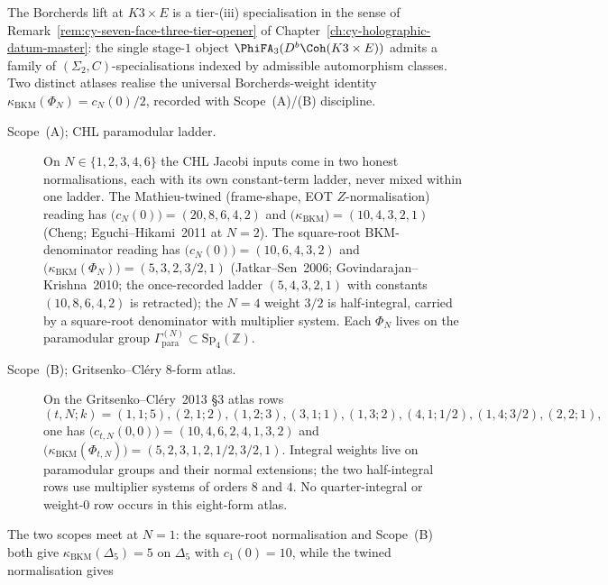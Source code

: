 \begin{remark}
\label{rem:modkos-k3e-cohft-three-tier}
The Borcherds lift at $K3 \times E$ is a tier-(iii)
specialisation in the sense of
Remark~\ref{rem:cy-seven-face-three-tier-opener} of
Chapter~\ref{ch:cy-holographic-datum-master}: the single stage-$1$
object $\PhiFA_3(D^b\Coh(K3 \times E))$ admits a family of
$(\Sigma_2, C)$-specialisations indexed by admissible automorphism
classes. Two distinct atlases realise the universal Borcherds-weight
identity $\kappa_{\mathrm{BKM}}(\Phi_N) = c_N(0)/2$, recorded with
Scope~(A)/(B) discipline.
\begin{description}
 \item[Scope~(A); CHL paramodular ladder.] On
 $N \in \{1, 2, 3, 4, 6\}$ the CHL Jacobi inputs come in two honest
 normalisations, each with its own constant-term ladder, never mixed
 within one ladder. The Mathieu-twined (frame-shape,
 EOT $Z$-normalisation) reading has
 $\bigl(c_N(0)\bigr) = (20, 8, 6, 4, 2)$ and
 $\bigl(\kappa_{\mathrm{BKM}}\bigr) = (10, 4, 3, 2, 1)$
 (Cheng; Eguchi--Hikami~2011 at $N = 2$). The square-root
 BKM-denominator reading has
 $\bigl(c_N(0)\bigr) = (10, 6, 4, 3, 2)$ and
 $\bigl(\kappa_{\mathrm{BKM}}(\Phi_N)\bigr) = (5, 3, 2, 3/2, 1)$
 (Jatkar--Sen~2006; Govindarajan--Krishna~2010; the once-recorded
 ladder $(5, 4, 3, 2, 1)$ with constants $(10, 8, 6, 4, 2)$ is
 retracted); the $N = 4$ weight $3/2$ is half-integral, carried by a
 square-root denominator with multiplier system. Each
 $\Phi_N$ lives on the paramodular group
 $\Gamma_{\mathrm{para}}^{(N)} \subset \mathrm{Sp}_4(\mathbb{Z})$.
 \item[Scope~(B); Gritsenko--Cl\'ery 8-form atlas.] On the
 Gritsenko--Cl\'ery~2013 \S3 atlas rows
 \[
 (t,N;k)=
 (1,1;5),(2,1;2),(1,2;3),(3,1;1),
 (1,3;2),(4,1;1/2),(1,4;3/2),(2,2;1),
 \]
 one has $\bigl(c_{t,N}(0,0)\bigr) =
 (10, 4, 6, 2, 4, 1, 3, 2)$ and
 $\bigl(\kappa_{\mathrm{BKM}}(\Phi_{t,N})\bigr) =
 (5, 2, 3, 1, 2, 1/2, 3/2, 1)$. Integral weights live on
 paramodular groups and their normal extensions; the two half-integral
 rows use multiplier systems of orders \(8\) and \(4\). No quarter-integral or weight-$0$
 row occurs in this eight-form atlas.
\end{description}
The two scopes meet at $N = 1$: the square-root normalisation and
Scope~(B) both give $\kappa_{\mathrm{BKM}}(\Delta_5) = 5$ on $\Delta_5$
with $c_1(0) = 10$, while the twined normalisation gives

\end{remark}
